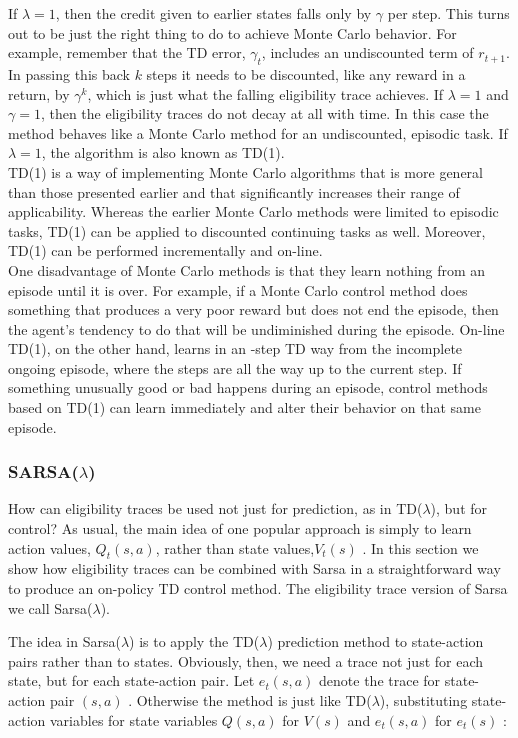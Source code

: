 \documentclass[11pt]{article}
\theoremstyle{plain}
\theoremstyle{definition}
\begin{document}
If $\lambda=1$, then the credit given to earlier states falls only by $\gamma$ per step. This turns out to be just the right thing to do to achieve Monte Carlo behavior. For example, remember that the TD error, $\gamma_t$, includes an undiscounted term of $r_{t+1}$. In passing this back $k$ steps it needs to be discounted, like any reward in a return, by $\gamma^k$, which is just what the falling eligibility trace achieves. If $\lambda=1$ and $\gamma=1$, then the eligibility traces do not decay at all with time. In this case the method behaves like a Monte Carlo method for an undiscounted, episodic task. If $\lambda=1$, the algorithm is also known as TD(1).
\\
TD(1) is a way of implementing Monte Carlo algorithms that is more general than those presented earlier and that significantly increases their range of applicability. Whereas the earlier Monte Carlo methods were limited to episodic tasks, TD(1) can be applied to discounted continuing tasks as well. Moreover, TD(1) can be performed incrementally and on-line.\\
 One disadvantage of Monte Carlo methods is that they learn nothing from an episode until it is over. For example, if a Monte Carlo control method does something that produces a very poor reward but does not end the episode, then the agent's tendency to do that will be undiminished during the episode. On-line TD(1), on the other hand, learns in an -step TD way from the incomplete ongoing episode, where the  steps are all the way up to the current step. If something unusually good or bad happens during an episode, control methods based on TD(1) can learn immediately and alter their behavior on that same episode.

\subsubsection{SARSA($\lambda$)}
How can eligibility traces be used not just for prediction, as in TD($\lambda $), but for control? As usual, the main idea of one popular approach is simply to learn action values, $Q_t(s,a)$, rather than state values,$V_t(s)$ . In this section we show how eligibility traces can be combined with Sarsa in a straightforward way to produce an on-policy TD control method. The eligibility trace version of Sarsa we call Sarsa($\lambda $).

The idea in Sarsa($\lambda $) is to apply the TD($\lambda $) prediction method to state-action pairs rather than to states. Obviously, then, we need a trace not just for each state, but for each state-action pair. Let $e_t(s,a)$ denote the trace for state-action pair $(s,a)$ . Otherwise the method is just like TD($\lambda $), substituting state-action variables for state variables $Q(s,a)$ for $V(s)$  and $e_t(s,a)$ for $e_t(s)$ : 
\end{document}

